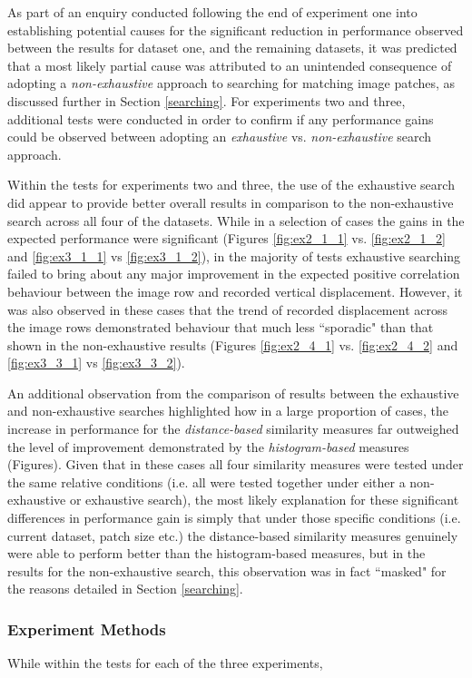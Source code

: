 As part of an enquiry conducted following the end of experiment one into establishing potential causes for the significant reduction in performance observed between the results for dataset one, and the remaining datasets, it was predicted that a most likely partial cause was attributed to an unintended consequence of adopting a \textit{non-exhaustive} approach to searching for matching image patches, as discussed further in Section \ref{searching}. For experiments two and three, additional tests were conducted in order to confirm if any performance gains could be observed between adopting an \textit{exhaustive} vs. \textit{non-exhaustive} search approach. 

Within the tests for experiments two and three, the use of the exhaustive search did appear to provide better overall results in comparison to the non-exhaustive search across all four of the datasets. While in a selection of cases the gains in the expected performance were significant (Figures \ref{fig:ex2_1_1} vs. \ref{fig:ex2_1_2} and  \ref{fig:ex3_1_1} vs \ref{fig:ex3_1_2}), in the majority of tests exhaustive searching failed to bring about any major improvement in the expected positive correlation behaviour between the image row and recorded vertical displacement. However, it was also observed in these cases that the trend of recorded displacement across the image rows demonstrated behaviour that much less ``sporadic" than that shown in the non-exhaustive results (Figures \ref{fig:ex2_4_1} vs. \ref{fig:ex2_4_2} and  \ref{fig:ex3_3_1} vs \ref{fig:ex3_3_2}).

An additional observation from the comparison of results between the exhaustive and non-exhaustive searches highlighted how in a large proportion of cases, the increase in performance for the \textit{distance-based} similarity measures far outweighed the level of improvement demonstrated by the \textit{histogram-based} measures (Figures). Given that in these cases all four similarity measures were tested under the same relative conditions (i.e. all were tested together under either a non-exhaustive or exhaustive search), the most likely explanation for these significant differences in performance gain is simply that under those specific conditions (i.e. current dataset, patch size etc.) the distance-based similarity measures genuinely were able to perform better than the histogram-based measures, but in the results for the non-exhaustive search, this observation was in fact ``masked" for the reasons detailed in Section \ref{searching}.

\subsubsection{Experiment Methods}

While within the tests for each of the three experiments, 

